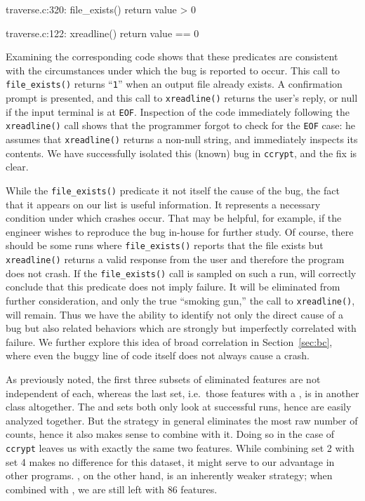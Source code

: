 \begin{features}
\item traverse.c:320: file\_exists() return value > 0
\item traverse.c:122: xreadline() return value == 0
\end{features}

Examining the corresponding code shows that these predicates are
consistent with the circumstances under which the bug is reported to
occur.  This call to \texttt{file\_exists()} returns ``{\tt 1}'' when an output
file already exists.  A confirmation prompt is presented, and this
call to \texttt{xreadline()} returns the user's reply, or null if the
input terminal is at \texttt{EOF}.  Inspection of the code immediately
following the \texttt{xreadline()} call shows that the programmer
forgot to check for the \texttt{EOF} case: he assumes that
\texttt{xreadline()} returns a non-null string, and immediately
inspects its contents.  We have successfully isolated this (known) bug
in \texttt{ccrypt}, and the fix is clear.

While the \texttt{file\_exists()} predicate it not itself the cause of
the bug, the fact that it appears on our list is useful information.
It represents a necessary condition under which crashes occur.  That
may be helpful, for example, if the engineer wishes to reproduce the
bug in-house for further study.  Of course, there should be some runs
where \texttt{file\_exists()} reports that the file exists but
\texttt{xreadline()} returns a valid response from the user and
therefore the program does not crash.  If the \texttt{file\_exists()}
call is sampled on such a run,  will correctly conclude that this predicate does not
imply failure.  It will be eliminated from further consideration, and
only the true ``smoking gun,'' the call to \texttt{xreadline()}, will
remain.  Thus we have the ability to identify not only the direct
cause of a bug but also related behaviors which are strongly but
imperfectly correlated with failure.  We further explore this idea of
broad correlation in Section~\ref{sec:bc}, where even the buggy line
of code itself does not always cause a crash.

As previously noted, the first three subsets of eliminated features
are not independent of each, whereas the last set, i.e.\ those
features with a , is in another class
altogether.  The  and  sets both only look at successful runs, hence are
easily analyzed together.  But the 
strategy in general eliminates the most raw number of counts, hence it
also makes sense to combine  with it.
Doing so in the case of \texttt{ccrypt} leaves us with exactly the
same two features.  While combining set 2 with set 4 makes no
difference for this dataset, it might serve to our advantage in other
programs.  , on the
other hand, is an inherently weaker strategy; when combined with
, we are still left with 86 features.

